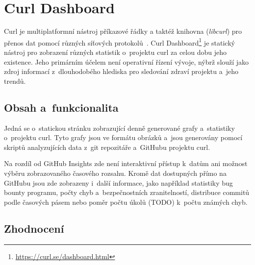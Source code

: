 

\section{Curl Dashboard}
\label{sec:curl_dashboard}

Curl je multiplatformní nástroj příkazové řádky a taktéž knihovna (\emph{libcurl}) pro přenos dat pomocí různých síťových protokolů~\cite{curl_about}. Curl Dashboard\footnote{\url{https://curl.se/dashboard.html}} je statický nástroj pro zobrazení různých statistik o~projektu curl za celou dobu jeho existence. Jeho primárním účelem není operativní řízení vývoje, nýbrž slouží jako zdroj informací z~dlouhodobého hlediska pro sledování zdraví projektu a~jeho trendů.

\subsection*{Obsah a~funkcionalita}
\label{subsec:curl_dashboard:content}

Jedná se o~statickou stránku zobrazující denně generované grafy a~statistiky o~projektu curl. Tyto grafy jsou ve formátu obrázků a~jsou generovány pomocí skriptů analyzujících data z~git repozitáře a~\API GitHubu projektu curl.

Na rozdíl od GitHub Insights  zde není interaktivní přístup k~datům ani možnost výběru zobrazovaného časového rozsahu. Kromě dat dostupných přímo na GitHubu jsou zde zobrazeny i~další informace, jako například statistiky bug bounty programu, počty chyb a~bezpečnostních zranitelností, distribuce commitů podle časových pásem nebo poměr počtu úkolů (TODO) k~počtu známých chyb.

\subsection*{Zhodnocení}
\label{subsec:curl_dashboard:evaluation}

